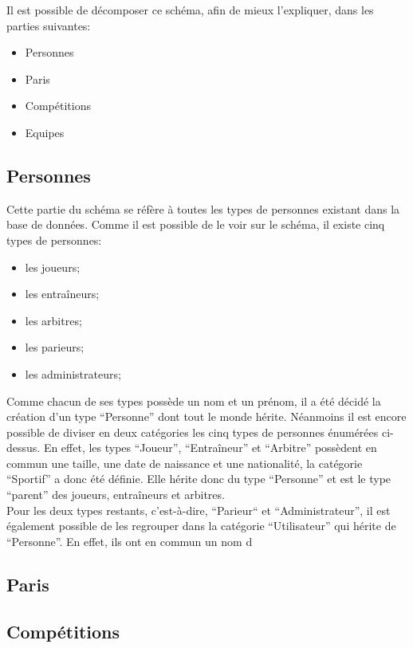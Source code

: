 \documentclass[10pt,a4paper,titlepage]{article}
\begin{document}
Il est possible de décomposer ce schéma, afin de mieux l'expliquer, dans les parties suivantes:
\begin{itemize}
	\item{Personnes}
	\item{Paris}
	\item{Compétitions}
	\item{Equipes}
\end{itemize}

\subsection{Personnes}
Cette partie du schéma se réfère à toutes les types de personnes existant dans la base de données. Comme il est possible de le voir sur le schéma, il existe cinq types de personnes:
\begin{itemize}
	\item{les joueurs;}
	\item{les entraîneurs;}
	\item{les arbitres;}
	\item{les parieurs;}
	\item{les administrateurs;}
\end{itemize}

Comme chacun de ses types possède un nom et un prénom, il a été décidé la création d'un type “Personne” dont tout le monde hérite. Néanmoins il est encore possible de diviser en deux catégories les cinq types de personnes énumérées ci-dessus. En effet, les types “Joueur”, “Entraîneur” et “Arbitre” possèdent en commun une taille, une date de naissance et une nationalité, la catégorie “Sportif” a donc été définie. Elle hérite donc du type “Personne” et est le type “parent” des joueurs, entraîneurs et arbitres.\\

Pour les deux types restants, c'est-à-dire, “Parieur“ et “Administrateur”, il est également possible de les regrouper dans la catégorie “Utilisateur” qui hérite de “Personne”. En effet, ils ont en commun un nom d

\subsection{Paris}

\subsection{Compétitions}
\end{document}

